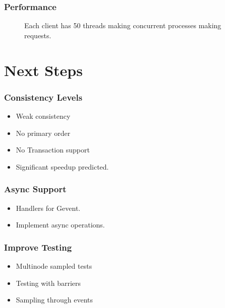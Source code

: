 \documentclass[10pt, compress]{beamer}
\begin{document}
\begin{frame}
    \frametitle{Performance}
    \begin{figure}
    \caption {Each client has 50 threads making concurrent processes making requests.}
  \end{figure}
\end{frame}


\section{Next Steps}
\begin{frame}[fragile]
    \frametitle{Consistency Levels}
    \begin{itemize}
        \item Weak consistency
        \item No primary order
        \item No Transaction support
        \item Significant speedup predicted.
    \end{itemize}
\end{frame}

\begin{frame}
    \frametitle{Async Support}
    \begin{itemize}
        \item Handlers for Gevent.
        \item Implement async operations.
    \end{itemize}

\end{frame}

\begin{frame}
    \frametitle{Improve Testing}
    \begin{itemize}
        \item Multinode sampled tests
        \item Testing with barriers
        \item Sampling through events
    \end{itemize}
\end{frame}
\end{document}
